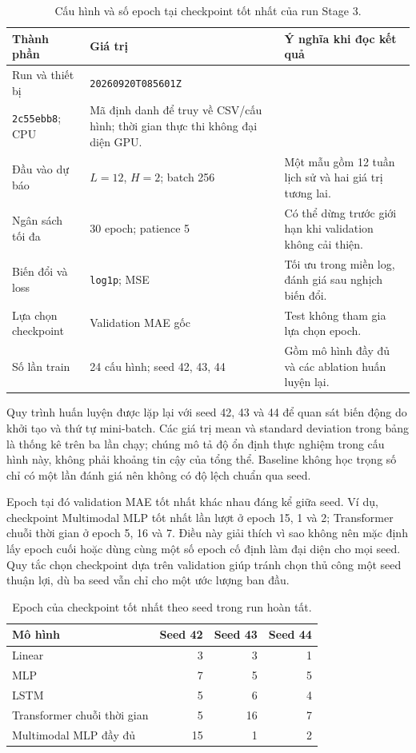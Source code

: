 \documentclass[12pt,a4paper,oneside]{article}
\begin{document}
\begin{table}[!htbp]
\centering
\small
\caption{Cấu hình và số epoch tại checkpoint tốt nhất của run Stage 3.}
\label{tab:training-config}
\begin{tabularx}{\textwidth}{p{}p{}X}
\toprule
Thành phần & Giá trị & Ý nghĩa khi đọc kết quả \\
\midrule
Run và thiết bị & \texttt{20260920T085601Z}\\\texttt{2c55ebb8}; CPU & Mã định danh để truy về CSV/cấu hình; thời gian thực thi không đại diện GPU. \\
Đầu vào dự báo & $L=12$, $H=2$; batch 256 & Một mẫu gồm 12 tuần lịch sử và hai giá trị tương lai. \\
Ngân sách tối đa & 30 epoch; patience 5 & Có thể dừng trước giới hạn khi validation không cải thiện. \\
Biến đổi và loss & \texttt{log1p}; MSE & Tối ưu trong miền log, đánh giá sau nghịch biến đổi. \\
Lựa chọn checkpoint & Validation MAE gốc & Test không tham gia lựa chọn epoch. \\
Số lần train & 24 cấu hình; seed 42, 43, 44 & Gồm mô hình đầy đủ và các ablation huấn luyện lại. \\
\bottomrule
\end{tabularx}
\end{table}

Quy trình huấn luyện được lặp lại với seed 42, 43 và 44 để quan sát biến động do khởi tạo và thứ tự mini-batch. Các giá trị mean và standard deviation trong bảng là thống kê trên ba lần chạy; chúng mô tả độ ổn định thực nghiệm trong cấu hình này, không phải khoảng tin cậy của tổng thể. Baseline không học trọng số chỉ có một lần đánh giá nên không có độ lệch chuẩn qua seed.

Epoch tại đó validation MAE tốt nhất khác nhau đáng kể giữa seed. Ví dụ, checkpoint Multimodal MLP tốt nhất lần lượt ở epoch 15, 1 và 2; Transformer chuỗi thời gian ở epoch 5, 16 và 7. Điều này giải thích vì sao không nên mặc định lấy epoch cuối hoặc dùng cùng một số epoch cố định làm đại diện cho mọi seed. Quy tắc chọn checkpoint dựa trên validation giúp tránh chọn thủ công một seed thuận lợi, dù ba seed vẫn chỉ cho một ước lượng ban đầu.

\begin{table}[!htbp]
\centering
\small
\caption{Epoch của checkpoint tốt nhất theo seed trong run hoàn tất.}
\label{tab:best-epochs}
\begin{tabular}{lrrr}
\toprule
Mô hình & Seed 42 & Seed 43 & Seed 44 \\
\midrule
Linear & 3 & 3 & 1 \\
MLP & 7 & 5 & 5 \\
LSTM & 5 & 6 & 4 \\
Transformer chuỗi thời gian & 5 & 16 & 7 \\
Multimodal MLP đầy đủ & 15 & 1 & 2 \\
\bottomrule
\end{tabular}
\end{table}
\end{document}
